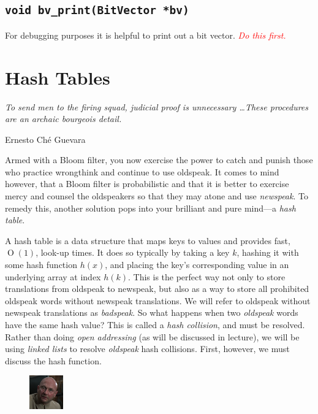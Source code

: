 \documentclass{article}
\begin{document}
\subsection{\texttt{void bv\_print(BitVector *bv)}}

For debugging purposes it is helpful to print out a bit vector.
\textcolor{red}{\emph{Do this first.}}


\section{Hash Tables}

\epigraph{\emph{To send men to the firing squad, judicial proof is
unnecessary \ldots These procedures are an archaic bourgeois
detail.}}{Ernesto Ch\'e Guevara}

\noindent Armed with a Bloom filter, you now exercise the power to catch and
punish those who practice wrongthink and continue to use oldspeak. It
comes to mind however, that a Bloom filter is probabilistic and that it
is better to exercise mercy and counsel the oldspeakers so that they may
atone and use \emph{newspeak}. To remedy this, another solution pops
into your brilliant and pure mind---a \emph{hash table}.

A hash table is a data structure that maps keys to values and provides
fast, $\operatorname{O}(1)$, look-up times. It does so typically by
taking a key $k$, hashing it with some hash function $h(x)$, and placing
the key's corresponding value in an underlying array at index $h(k)$.
This is the perfect way not only to store translations from oldspeak to
newspeak, but also as a way to store all prohibited oldspeak words
without newspeak translations. We will refer to oldspeak without
newspeak translations as \emph{badspeak}. So what happens when two
\emph{oldspeak} words have the same hash value?  This is called a
\emph{hash collision}, and must be resolved. Rather than doing
\emph{open addressing} (as will be discussed in lecture), we will be
using \emph{linked lists} to resolve \emph{oldspeak} hash collisions.
First, however, we must discuss the hash function.

\begin{figure}
\centering
\includegraphics[width=0.130\textwidth]{Blofeld.png}
\end{figure}
\end{document}
